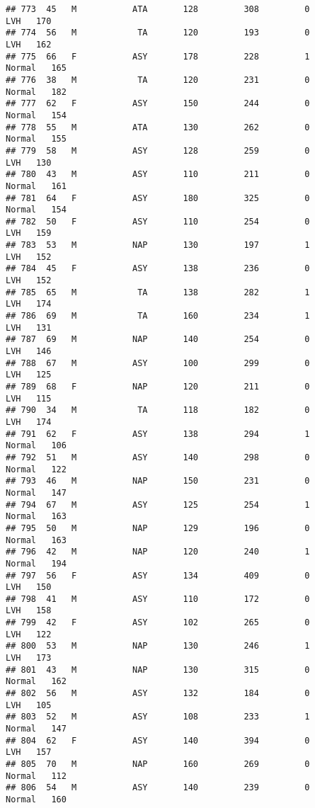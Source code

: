 \documentclass[
]{article}
\begin{document}
\begin{verbatim}
## 773  45   M           ATA       128         308         0        LVH   170
## 774  56   M            TA       120         193         0        LVH   162
## 775  66   F           ASY       178         228         1     Normal   165
## 776  38   M            TA       120         231         0     Normal   182
## 777  62   F           ASY       150         244         0     Normal   154
## 778  55   M           ATA       130         262         0     Normal   155
## 779  58   M           ASY       128         259         0        LVH   130
## 780  43   M           ASY       110         211         0     Normal   161
## 781  64   F           ASY       180         325         0     Normal   154
## 782  50   F           ASY       110         254         0        LVH   159
## 783  53   M           NAP       130         197         1        LVH   152
## 784  45   F           ASY       138         236         0        LVH   152
## 785  65   M            TA       138         282         1        LVH   174
## 786  69   M            TA       160         234         1        LVH   131
## 787  69   M           NAP       140         254         0        LVH   146
## 788  67   M           ASY       100         299         0        LVH   125
## 789  68   F           NAP       120         211         0        LVH   115
## 790  34   M            TA       118         182         0        LVH   174
## 791  62   F           ASY       138         294         1     Normal   106
## 792  51   M           ASY       140         298         0     Normal   122
## 793  46   M           NAP       150         231         0     Normal   147
## 794  67   M           ASY       125         254         1     Normal   163
## 795  50   M           NAP       129         196         0     Normal   163
## 796  42   M           NAP       120         240         1     Normal   194
## 797  56   F           ASY       134         409         0        LVH   150
## 798  41   M           ASY       110         172         0        LVH   158
## 799  42   F           ASY       102         265         0        LVH   122
## 800  53   M           NAP       130         246         1        LVH   173
## 801  43   M           NAP       130         315         0     Normal   162
## 802  56   M           ASY       132         184         0        LVH   105
## 803  52   M           ASY       108         233         1     Normal   147
## 804  62   F           ASY       140         394         0        LVH   157
## 805  70   M           NAP       160         269         0     Normal   112
## 806  54   M           ASY       140         239         0     Normal   160

\end{verbatim}
\end{document}
